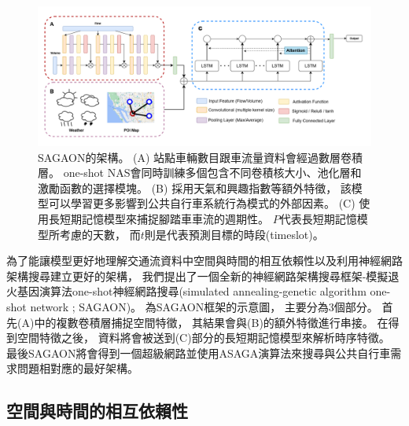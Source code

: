 \documentclass[a4paper,14pt]{extarticle}
\begin{document}
        \begin{figure}[h]
            \includegraphics[width=\textwidth]{SAGAON.png}
            \caption{
                {\fontsize{12pt}{10pt}\selectfont
                    SAGAON的架構。
                    (A) 站點車輛數目跟車流量資料會經過數層卷積層。
                    one-shot NAS會同時訓練多個包含不同卷積核大小、池化層和激勵函數的選擇模塊。
                    (B) 採用天氣和興趣指數等額外特徵，
                    該模型可以學習更多影響到公共自行車系統行為模式的外部因素。
                    (C) 使用長短期記憶模型來捕捉腳踏車車流的週期性。
                    $P$代表長短期記憶模型所考慮的天數，
                    而$t$則是代表預測目標的時段(timeslot)。
                }
            }
            \label{fig:SAGAON}
        \end{figure}

        為了能讓模型更好地理解交通流資料中空間與時間的相互依賴性以及利用神經網路架構搜尋建立更好的架構，
        我們提出了一個全新的神經網路架構搜尋框架-模擬退火基因演算法one-shot神經網路搜尋(simulated annealing-genetic algorithm one-shot network ; SAGAON)。
        為SAGAON框架的示意圖，
        主要分為3個部分。
        首先(A)中的複數卷積層捕捉空間特徵，
        其結果會與(B)的額外特徵進行串接。
        在得到空間特徵之後，
        資料將會被送到(C)部分的長短期記憶模型來解析時序特徵。
        最後SAGAON將會得到一個超級網路並使用ASAGA演算法來搜尋與公共自行車需求問題相對應的最好架構。
        
        \subsection{空間與時間的相互依賴性}
            \label{subsec:spatial_temporal}
            
\end{document}

